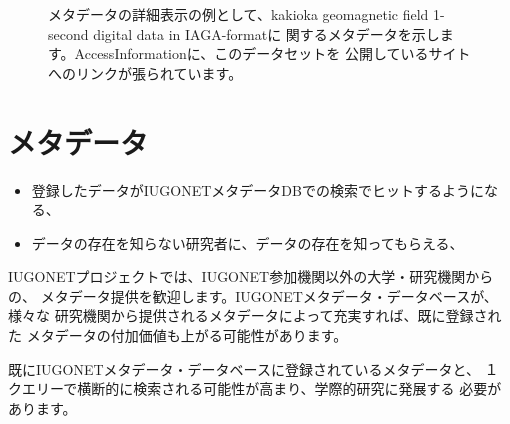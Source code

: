 \begin{figure}[H]
\begin{center}
\caption{メタデータの詳細表示の例として、kakioka geomagnetic field 1-second digital data in IAGA-formatに
関するメタデータを示します。AccessInformationに、このデータセットを
公開しているサイトへのリンクが張られています。}
\label{mdb3.eps}
\end{center}
\end{figure}

\section{メタデータ}
\begin{itemize}
\item 登録したデータがIUGONETメタデータDBでの検索でヒットするようになる、
\item データの存在を知らない研究者に、データの存在を知ってもらえる、
\end{itemize}

IUGONETプロジェクトでは、IUGONET参加機関以外の大学・研究機関からの、
メタデータ提供を歓迎します。IUGONETメタデータ・データベースが、様々な
研究機関から提供されるメタデータによって充実すれば、既に登録された
メタデータの付加価値も上がる可能性があります。

既にIUGONETメタデータ・データベースに登録されているメタデータと、
１クエリーで横断的に検索される可能性が高まり、学際的研究に発展する
必要があります。